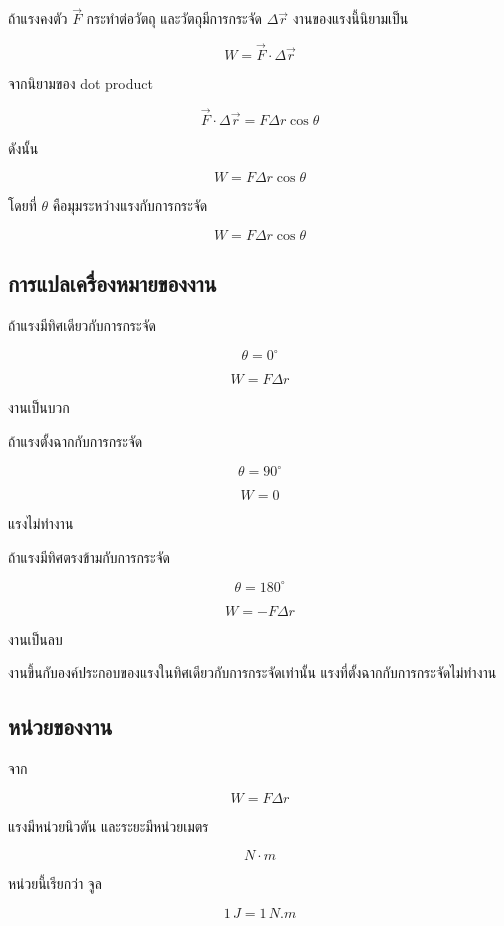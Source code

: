ถ้าแรงคงตัว $\vec{F}$ กระทำต่อวัตถุ และวัตถุมีการกระจัด $\Delta \vec{r}$ งานของแรงนี้นิยามเป็น

\[
W=\vec{F}\cdot \Delta \vec{r}
\]

จากนิยามของ dot product

\[
\vec{F}\cdot \Delta \vec{r}=F\Delta r\cos\theta
\]

ดังนั้น

\[
W=F\Delta r\cos\theta
\]

โดยที่ $\theta$ คือมุมระหว่างแรงกับการกระจัด

\begin{tcolorbox}[title=งานของแรงคงตัว]
\[
W=F\Delta r\cos\theta
\]
\end{tcolorbox}

\subsection{การแปลเครื่องหมายของงาน}

ถ้าแรงมีทิศเดียวกับการกระจัด

\[
\theta=0^\circ
\]

\[
W=F\Delta r
\]

งานเป็นบวก

ถ้าแรงตั้งฉากกับการกระจัด

\[
\theta=90^\circ
\]

\[
W=0
\]

แรงไม่ทำงาน

ถ้าแรงมีทิศตรงข้ามกับการกระจัด

\[
\theta=180^\circ
\]

\[
W=-F\Delta r
\]

งานเป็นลบ

\begin{tcolorbox}[title=ข้อควรจำ]
งานขึ้นกับองค์ประกอบของแรงในทิศเดียวกับการกระจัดเท่านั้น แรงที่ตั้งฉากกับการกระจัดไม่ทำงาน
\end{tcolorbox}

\subsection{หน่วยของงาน}

จาก

\[
W=F\Delta r
\]

แรงมีหน่วยนิวตัน และระยะมีหน่วยเมตร

\[
\si{N}\cdot \si{m}
\]

หน่วยนี้เรียกว่า จูล

\[
1\,\si{J}=1\,\si{N.m}
\]

